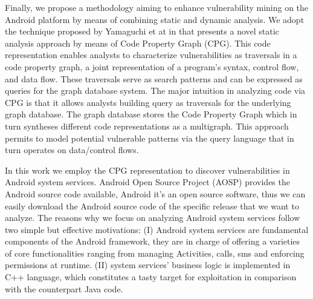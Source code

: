 Finally, we propose a methodology aiming to enhance vulnerability mining on the Android platform by means of combining static and dynamic analysis. 
We adopt the technique proposed by Yamaguchi et at in \cite{yamaguchi2014modeling,yamaguchi2015automatic,yamaguchi2011vulnerability} that presents a novel static analysis approach by means of Code Property Graph (CPG). This code representation enables analysts to characterize vulnerabilities as traversals in a code property graph, a joint representation of a program’s syntax, control flow, and data flow. These traversals serve as search patterns and can be expressed as queries for the graph database system. The major intuition in analyzing code via CPG is that it allows analysts building query as traversals for the underlying graph database. The graph database stores the Code Property Graph which in turn syntheses different code representations as a multigraph. This approach permits to model  potential vulnerable patterns via the query language that in turn operates on data/control flows.


In this work we employ the CPG representation to discover vulnerabilities in Android system services. Android Open Source Project (AOSP) provides the Android source code available, Android it's an open source software, thus we can easily download the Android source code of the specific release that we want to analyze.  The reasons why we focus on analyzing Android system services follow two simple but effective motivations: (I) Android system services are fundamental components of the Android framework, they are in charge of offering a varieties of core functionalities ranging from managing Activities, calls, sms and enforcing permissions at runtime. (II) system services' business logic is implemented in C++ language, which constitutes a tasty target for exploitation in comparison with the counterpart Java code.

